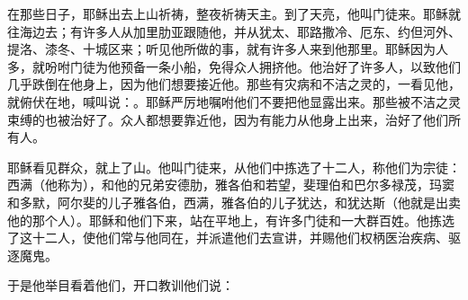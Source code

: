 \par

\par

在那些日子，耶稣出去上山祈祷，整夜祈祷天主。到了天亮，他叫门徒来。耶稣就往海边去；有许多人从加里肋亚跟随他，并从犹太、耶路撒冷、厄东、约但河外、提洛、漆冬、十城区来；听见他所做的事，就有许多人来到他那里。耶稣因为人多，就吩咐门徒为他预备一条小船，免得众人拥挤他。他治好了许多人，以致他们几乎跌倒在他身上，因为他们想要接近他。那些有灾病和不洁之灵的，一看见他，就俯伏在地，喊叫说：。耶稣严厉地嘱咐他们不要把他显露出来。那些被不洁之灵束缚的也被治好了。众人都想要靠近他，因为有能力从他身上出来，治好了他们所有人。\par

耶稣看见群众，就上了山。他叫门徒来，从他们中拣选了十二人，称他们为宗徒：西满（他称为），和他的兄弟安德肋，雅各伯和若望，斐理伯和巴尔多禄茂，玛窦和多默，阿尔斐的儿子雅各伯，西满，雅各伯的儿子犹达，和犹达斯（他就是出卖他的那个人）。耶稣和他们下来，站在平地上，有许多门徒和一大群百姓。他拣选了这十二人，使他们常与他同在，并派遣他们去宣讲，并赐他们权柄医治疾病、驱逐魔鬼。\par

于是他举目看着他们，开口教训他们说：\par

\par

